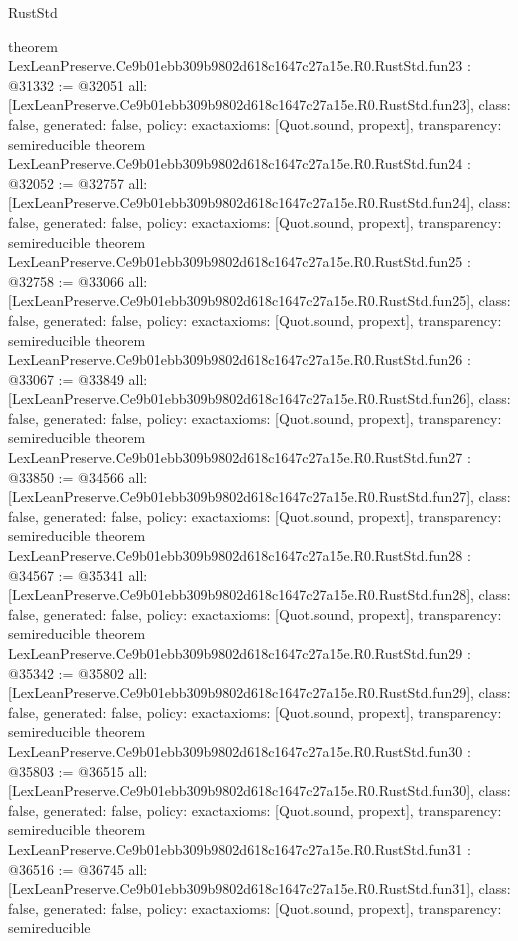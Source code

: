 \begin{lexlean}{RustStd}
\begin{coremodule}
{}
theorem LexLeanPreserve.Ce9b01ebb309b9802d618c1647c27a15e.R0.RustStd.fun23 : @31332 := @32051 {
  all: [LexLeanPreserve.Ce9b01ebb309b9802d618c1647c27a15e.R0.RustStd.fun23],
  class: false,
  generated: false,
  policy: exact{axioms: [Quot.sound, propext]},
  transparency: semireducible
}
theorem LexLeanPreserve.Ce9b01ebb309b9802d618c1647c27a15e.R0.RustStd.fun24 : @32052 := @32757 {
  all: [LexLeanPreserve.Ce9b01ebb309b9802d618c1647c27a15e.R0.RustStd.fun24],
  class: false,
  generated: false,
  policy: exact{axioms: [Quot.sound, propext]},
  transparency: semireducible
}
theorem LexLeanPreserve.Ce9b01ebb309b9802d618c1647c27a15e.R0.RustStd.fun25 : @32758 := @33066 {
  all: [LexLeanPreserve.Ce9b01ebb309b9802d618c1647c27a15e.R0.RustStd.fun25],
  class: false,
  generated: false,
  policy: exact{axioms: [Quot.sound, propext]},
  transparency: semireducible
}
theorem LexLeanPreserve.Ce9b01ebb309b9802d618c1647c27a15e.R0.RustStd.fun26 : @33067 := @33849 {
  all: [LexLeanPreserve.Ce9b01ebb309b9802d618c1647c27a15e.R0.RustStd.fun26],
  class: false,
  generated: false,
  policy: exact{axioms: [Quot.sound, propext]},
  transparency: semireducible
}
theorem LexLeanPreserve.Ce9b01ebb309b9802d618c1647c27a15e.R0.RustStd.fun27 : @33850 := @34566 {
  all: [LexLeanPreserve.Ce9b01ebb309b9802d618c1647c27a15e.R0.RustStd.fun27],
  class: false,
  generated: false,
  policy: exact{axioms: [Quot.sound, propext]},
  transparency: semireducible
}
theorem LexLeanPreserve.Ce9b01ebb309b9802d618c1647c27a15e.R0.RustStd.fun28 : @34567 := @35341 {
  all: [LexLeanPreserve.Ce9b01ebb309b9802d618c1647c27a15e.R0.RustStd.fun28],
  class: false,
  generated: false,
  policy: exact{axioms: [Quot.sound, propext]},
  transparency: semireducible
}
theorem LexLeanPreserve.Ce9b01ebb309b9802d618c1647c27a15e.R0.RustStd.fun29 : @35342 := @35802 {
  all: [LexLeanPreserve.Ce9b01ebb309b9802d618c1647c27a15e.R0.RustStd.fun29],
  class: false,
  generated: false,
  policy: exact{axioms: [Quot.sound, propext]},
  transparency: semireducible
}
theorem LexLeanPreserve.Ce9b01ebb309b9802d618c1647c27a15e.R0.RustStd.fun30 : @35803 := @36515 {
  all: [LexLeanPreserve.Ce9b01ebb309b9802d618c1647c27a15e.R0.RustStd.fun30],
  class: false,
  generated: false,
  policy: exact{axioms: [Quot.sound, propext]},
  transparency: semireducible
}
theorem LexLeanPreserve.Ce9b01ebb309b9802d618c1647c27a15e.R0.RustStd.fun31 : @36516 := @36745 {
  all: [LexLeanPreserve.Ce9b01ebb309b9802d618c1647c27a15e.R0.RustStd.fun31],
  class: false,
  generated: false,
  policy: exact{axioms: [Quot.sound, propext]},
  transparency: semireducible
}
\end{coremodule}
\end{lexlean}
